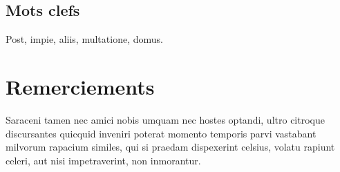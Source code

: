 \documentclass[oneside]{memoir}
\begin{document}
\section*{Mots clefs}
Post, impie, aliis, multatione, domus.

\pagebreak

\setcounter{page}{1}



\chapter*{Remerciements}
Saraceni tamen nec amici nobis umquam nec hostes optandi, ultro
citroque discursantes quicquid inveniri poterat momento temporis parvi
vastabant milvorum rapacium similes, qui si praedam dispexerint
celsius, volatu rapiunt celeri, aut nisi impetraverint, non
inmorantur.




\appendix

% 
\end{document}
